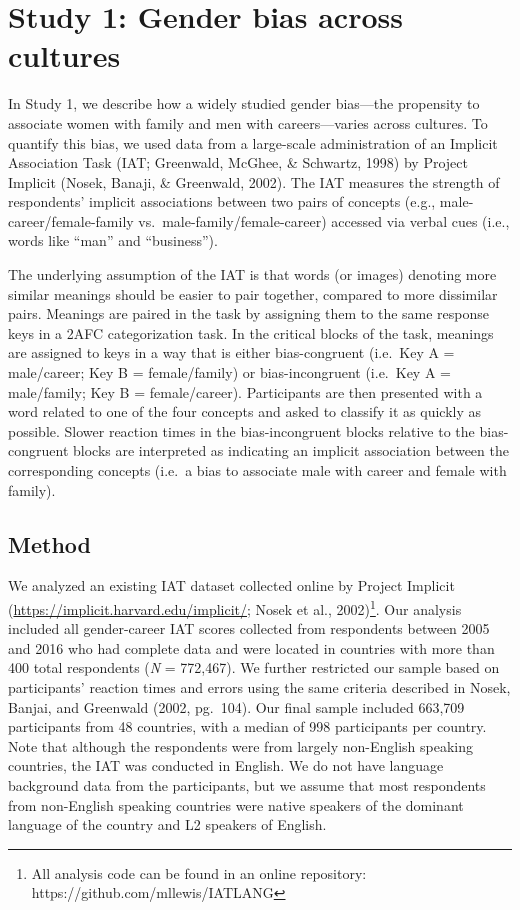 \documentclass[10pt, letterpaper]{article}
\begin{document}
\section{Study 1: Gender bias across
cultures}\label{study-1-gender-bias-across-cultures}

In Study 1, we describe how a widely studied gender bias---the
propensity to associate women with family and men with careers---varies
across cultures. To quantify this bias, we used data from a large-scale
administration of an Implicit Association Task (IAT; Greenwald, McGhee,
\& Schwartz, 1998) by Project Implicit (Nosek, Banaji, \& Greenwald,
2002). The IAT measures the strength of respondents' implicit
associations between two pairs of concepts (e.g.,
male-career/female-family vs.~male-family/female-career) accessed via
verbal cues (i.e., words like ``man'' and ``business'').

The underlying assumption of the IAT is that words (or images) denoting
more similar meanings should be easier to pair together, compared to
more dissimilar pairs. Meanings are paired in the task by assigning them
to the same response keys in a 2AFC categorization task. In the critical
blocks of the task, meanings are assigned to keys in a way that is
either bias-congruent (i.e.~Key A = male/career; Key B = female/family)
or bias-incongruent (i.e.~Key A = male/family; Key B = female/career).
Participants are then presented with a word related to one of the four
concepts and asked to classify it as quickly as possible. Slower
reaction times in the bias-incongruent blocks relative to the
bias-congruent blocks are interpreted as indicating an implicit
association between the corresponding concepts (i.e.~a bias to associate
male with career and female with family).

\subsection{Method}\label{method}

We analyzed an existing IAT dataset collected online by Project Implicit
(\url{https://implicit.harvard.edu/implicit/}; Nosek et al.,
2002)\footnote{All analysis code can be found in an online repository: https://github.com/mllewis/IATLANG}.
Our analysis included all gender-career IAT scores collected from
respondents between 2005 and 2016 who had complete data and were located
in countries with more than 400 total respondents (\emph{N} = 772,467).
We further restricted our sample based on participants' reaction times
and errors using the same criteria described in Nosek, Banjai, and
Greenwald (2002, pg.~104). Our final sample included 663,709
participants from 48 countries, with a median of 998 participants per
country. Note that although the respondents were from largely
non-English speaking countries, the IAT was conducted in English. We do
not have language background data from the participants, but we assume
that most respondents from non-English speaking countries were native
speakers of the dominant language of the country and L2 speakers of
English.
\end{document}
